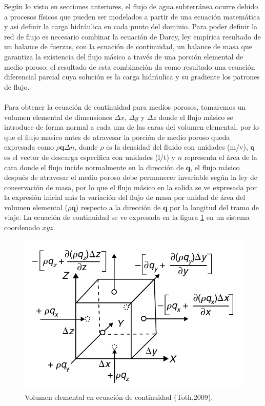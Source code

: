 Según lo visto en secciones anteriores, el flujo de agua subterránea ocurre debido a procesos físicos que pueden ser modelados a partir de una ecuación matemática y asi definir la carga hidráulica en cada punto del dominio. Para poder definir la red de flujo es necesario combinar la ecuación de Darcy, ley empírica resultado de un balance de fuerzas, con la ecuación de continuidad, un balance de masa que garantiza la existencia del flujo másico a través de una porción elemental de medio poroso; el resultado de esta combinación da como resultado una ecuación diferencial parcial cuya solución es la carga hidráulica y su gradiente los patrones de flujo.
\\
\\
Para obtener la ecuación de continuidad para medios porosos, tomaremos un volumen elemental de dimensiones $\Delta{x}$, $\Delta{y}$ y $\Delta{z}$ donde el flujo másico se introduce de forma normal a cada una de las caras del volumen elemental, por lo que el flujo masico antes de atravesar la porción de medio poroso queda expresada como $\rho{\textbf{q}}\Delta{n}$, donde $\rho$ es la densidad del fluido con unidades (m/v), $\textbf{q}$ es el vector de descarga especifica con unidades (l/t) y $n$ representa el área de la cara donde el flujo incide normalmente en la dirección de $\textbf{q}$, el flujo másico después de atravesar el medio poroso debe permanecer invariable según la ley de conservación de masa, por lo que el flujo másico en la salida se ve expresada por la expresión inicial más la variación del flujo de masa por unidad de área del volumen elemental  ($\rho\textbf{q}$) respecto a la dirección de $\textbf{q}$ por la longitud del tramo de viaje. La ecuación de continuidad se ve expresada en la figura \ref{Figura6:1.6} en un sistema coordenado $xyz$.

\begin{figure}[ht!]
\centering
\includegraphics[scale=0.50]{Figura13.png}
\caption{Volumen elemental en ecuación de continuidad (Toth,2009).}
\label{Figura6:1.6}
\end{figure} 

